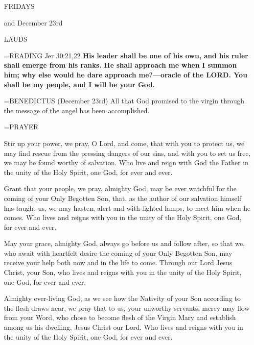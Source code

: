 \begin{center}
\normalsize \begin{center}\normalsize FRIDAYS\\
\end{center}
\footnotesize and December 23rd\\
\end{center}

\begin{flushleft}\normalsize LAUDS\\\end{flushleft}

\hangindent=\parindent \small{READING} Jer 30:21,22 \textbf{His leader shall be one of his own, and his ruler shall emerge from his ranks. He shall approach me when I summon him; why else would he dare approach me?—oracle of the LORD. You shall be my people, and I will be your God.\\}

\hangindent=\parindent \small{BENEDICTUS  (December 23rd) All that God promised to the virgin through the message of the angel has been accomplished.\\}

\hangindent=\parindent \small PRAYER
\begin{description}[labelindent=\parindent, noitemsep, leftmargin=*]
\item [Week 1:]  Stir up your power, we pray, O Lord, and come, that with you to protect us, we may find rescue from the pressing dangers of our sins, and with you to set us free, we may be found worthy of salvation. Who live and reign with God the Father in the unity of the Holy Spirit, one God, for ever and ever.
\item [Week 2:]  Grant that your people, we pray, almighty God, may be ever watchful for the coming of your Only Begotten Son, that, as the author of our salvation himself has taught us, we may hasten, alert and with lighted lamps, to meet him when he comes. Who lives and reigns with you in the unity of the Holy Spirit, one God, for ever and ever.
\item [Week 3:]  May your grace, almighty God, always go before us and follow after, so that we, who await with heartfelt desire the coming of your Only Begotten Son, may receive your help both now and in the life to come. Through our Lord Jesus Christ, your Son, who lives and reigns with you in the unity of the Holy Spirit, one God, for ever and ever.
\item [December 23rd:]  Almighty ever-living God, as we see how the Nativity of your Son according to the flesh draws near, we pray that to us, your unworthy servants, mercy may flow from your Word, who chose to become flesh of the Virgin Mary and establish among us his dwelling, Jesus Christ our Lord. Who lives and reigns with you in the unity of the Holy Spirit, one God, for ever and ever.
\end{description}

